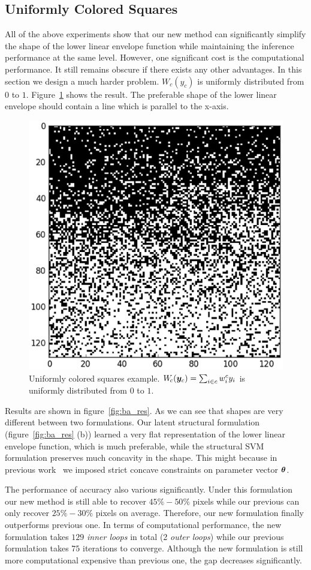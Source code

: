 \subsection{Uniformly Colored Squares}
\label{sec:unif-distr-squar}

All of the above experiments show that our new method can
significantly simplify the shape of the lower linear envelope
function while maintaining the inference performance at the same
level. However, one significant cost is the computational
performance. It still remains obscure if there exists any other
advantages. In this section we design a much harder problem.
$W_c(y_c)$ is uniformly distributed from $0$ to $1$.
Figure~\ref{fig:ba_gt} shows the result. The preferable shape of
the lower linear envelope should contain a line which is parallel
to the x-axis.

\begin{figure}[t]
  \centering
  \includegraphics[width=0.5\columnwidth]{Part2/figures/ba_gt.png}
  \caption{\label{fig:ba_gt} Uniformly colored squares example.
    $W_{\!c}({\bm{y}}_c) = \sum_{i \in c} w^c_i y_i$ is uniformly
    distributed from $0$ to $1$.}
\end{figure}

Results are shown in figure~\ref{fig:ba_res}. As we can see
that shapes are very different between two formulations. Our
latent structural formulation (figure~\ref{fig:ba_res} (b))
learned a very flat representation of the lower linear envelope
function, which is much preferable, while the structural SVM
formulation preserves much concavity in the shape. This might
because in previous work~\cite{gouldlearning,Gould:ICML2011}
we imposed strict concave constraints on parameter vector
${\bm{\theta}}$.

The performance of accuracy also various significantly. Under
this formulation our new method is still able to recover
$45\%-50\%$ pixels while our previous can only recover
$25\%-30\%$ pixels on average. Therefore, our new formulation
finally outperforms previous one. In terms of computational
performance, the new formulation takes $129$ \emph{inner loops}
in total (2 \emph{outer loops}) while our previous formulation
takes $75$ iterations to converge. Although the new formulation
is still more computational expensive than previous one, the gap
decreases significantly.

